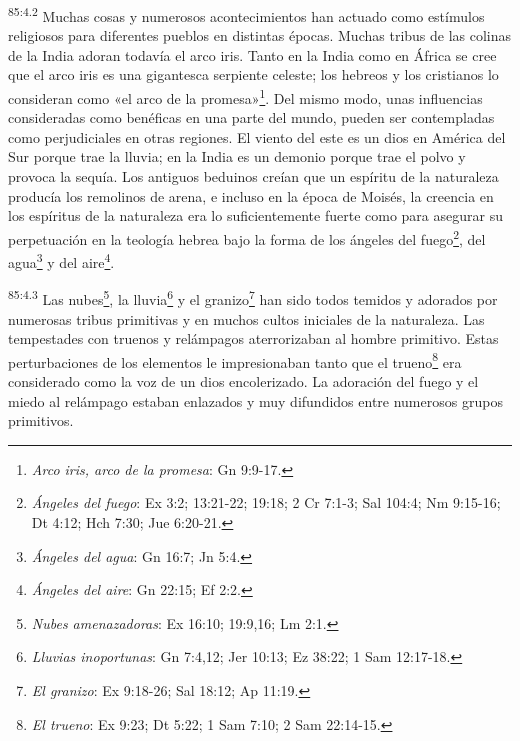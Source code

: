 \par
\textsuperscript{85:4.2} Muchas cosas y numerosos acontecimientos han actuado como estímulos religiosos para diferentes pueblos en distintas épocas. Muchas tribus de las colinas de la India adoran todavía el arco iris. Tanto en la India como en África se cree que el arco iris es una gigantesca serpiente celeste; los hebreos y los cristianos lo consideran como «el arco de la promesa»\footnote{\textit{Arco iris, arco de la promesa}: Gn 9:9-17.}. Del mismo modo, unas influencias consideradas como benéficas en una parte del mundo, pueden ser contempladas como perjudiciales en otras regiones. El viento del este es un dios en América del Sur porque trae la lluvia; en la India es un demonio porque trae el polvo y provoca la sequía. Los antiguos beduinos creían que un espíritu de la naturaleza producía los remolinos de arena, e incluso en la época de Moisés, la creencia en los espíritus de la naturaleza era lo suficientemente fuerte como para asegurar su perpetuación en la teología hebrea bajo la forma de los ángeles del fuego\footnote{\textit{Ángeles del fuego}: Ex 3:2; 13:21-22; 19:18; 2 Cr 7:1-3; Sal 104:4; Nm 9:15-16; Dt 4:12; Hch 7:30; Jue 6:20-21.}, del agua\footnote{\textit{Ángeles del agua}: Gn 16:7; Jn 5:4.} y del aire\footnote{\textit{Ángeles del aire}: Gn 22:15; Ef 2:2.}.

\par
\textsuperscript{85:4.3} Las nubes\footnote{\textit{Nubes amenazadoras}: Ex 16:10; 19:9,16; Lm 2:1.}, la lluvia\footnote{\textit{Lluvias inoportunas}: Gn 7:4,12; Jer 10:13; Ez 38:22; 1 Sam 12:17-18.} y el granizo\footnote{\textit{El granizo}: Ex 9:18-26; Sal 18:12; Ap 11:19.} han sido todos temidos y adorados por numerosas tribus primitivas y en muchos cultos iniciales de la naturaleza. Las tempestades con truenos y relámpagos aterrorizaban al hombre primitivo. Estas perturbaciones de los elementos le impresionaban tanto que el trueno\footnote{\textit{El trueno}: Ex 9:23; Dt 5:22; 1 Sam 7:10; 2 Sam 22:14-15.} era considerado como la voz de un dios encolerizado. La adoración del fuego y el miedo al relámpago estaban enlazados y muy difundidos entre numerosos grupos primitivos.

